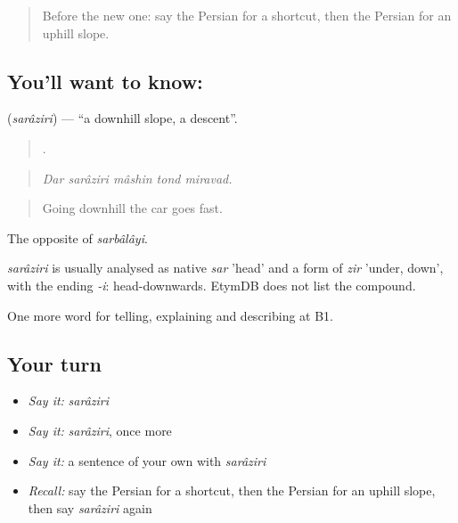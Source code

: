 \label{lesson:FA-C448-saraziri}



\begin{quote}
Before the new one: say the Persian for a shortcut, then the Persian for an uphill slope.
\end{quote}

\subsection*{You'll want to know: }
\textbf{} (\emph{sarâziri}) — \textquotedblleft{}a downhill slope, a descent\textquotedblright{}.

\begin{quote}
    .
\end{quote}

\begin{quote}
\emph{Dar sarâziri mâshin tond miravad.}
\end{quote}

\begin{quote}
Going downhill the car goes fast.
\end{quote}

The opposite of \emph{sarbâlâyi}.

\begin{cousinweb}
\emph{sarâziri} is usually analysed as native \emph{sar} 'head' and a form of \emph{zir} 'under, down', with the ending \emph{-i}: head-downwards. EtymDB does not list the compound.
\end{cousinweb}

\begin{grammarlens}[title={What you've built}]
One more word for telling, explaining and describing at B1.
\end{grammarlens}

\subsection*{Your turn}
\begin{itemize}
\raggedright
  \item \emph{Say it:} \emph{sarâziri}
  \item \emph{Say it:} \emph{sarâziri}, once more
  \item \emph{Say it:} a sentence of your own with \emph{sarâziri}
  \item \emph{Recall:} say the Persian for a shortcut, then the Persian for an uphill slope, then say \emph{sarâziri} again
\end{itemize}


